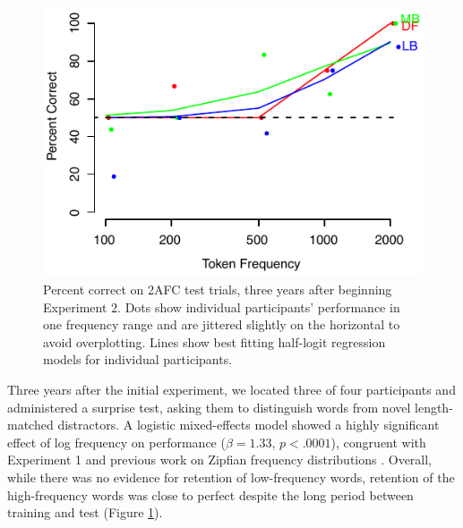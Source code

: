 \documentclass[10pt]{article}
\begin{document}


\begin{figure}[t]
\begin{center}
\includegraphics{figures/mseg2afc_col.pdf}
\caption{\label{fig:2afc} Percent correct on 2AFC test trials, three years after beginning Experiment 2. Dots show individual participants' performance in one frequency range and are jittered slightly on the horizontal to avoid overplotting. Lines show best fitting half-logit regression models for individual participants.}
\end{center}
\end{figure}

Three years after the initial experiment, we located three of four participants and administered a surprise test, asking them to distinguish words from novel length-matched distractors. A logistic mixed-effects model showed a highly significant effect of log frequency on performance ($\beta = 1.33$, $p < .0001$), congruent with Experiment 1 and previous work on Zipfian frequency distributions \cite{kurumada2011}. Overall, while there was no evidence for retention of low-frequency words, retention of the high-frequency words was close to perfect despite the long period between training and test (Figure \ref{fig:2afc}).
\end{document}
